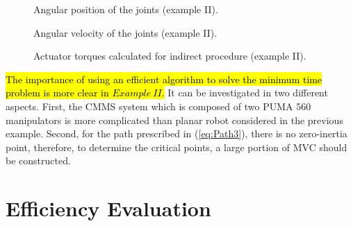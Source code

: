\documentclass{rob}%
\begin{document}
\begin{figure}[!t]
	\centering
	\hfil
	\caption{Angular position of the joints (example II).}
	\label{fig:theta12}
\end{figure}

\begin{figure}[!t]
	\centering
	\hfil
	\caption{Angular velocity of the joints (example II).}
	\label{fig:dtheta12}
\end{figure}

\begin{figure}[!t]
	\centering
	\hfil
	\caption{Actuator torques calculated for indirect procedure (example II).}
	\label{fig:tau_manp3}
\end{figure}

\hl{The importance of using an efficient algorithm to solve the minimum time problem is more clear in $ Example \ II $.} It can be investigated in two different aspects. First, the CMMS system which is composed of two PUMA 560 manipulators is more complicated than planar robot considered in  the previous example.
Second, for the path prescribed in (\ref{eq:Path3}), there is no zero-inertia point, therefore, to determine the critical points, a large portion of MVC should be constructed.

\section{Efficiency Evaluation}
\label{sec:EE}
\end{document}
